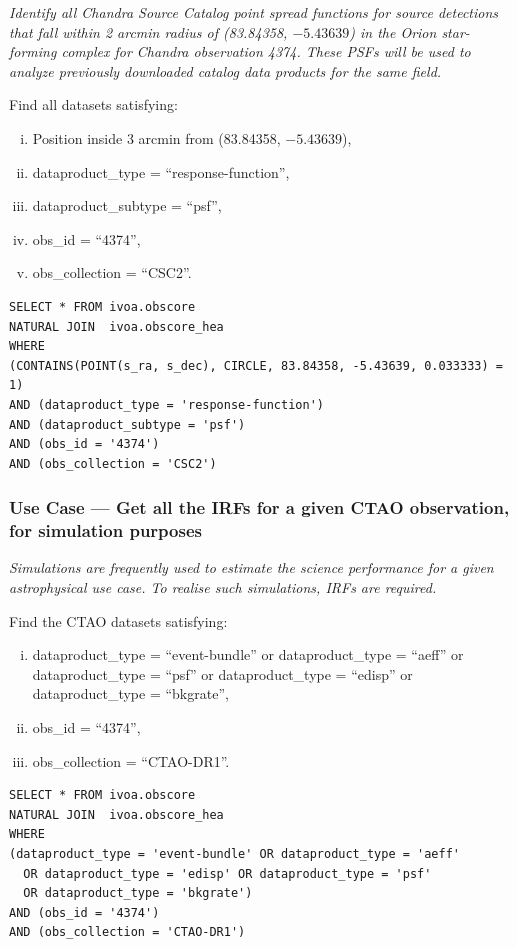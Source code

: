 {\em Identify all Chandra Source Catalog point spread functions for source detections that fall within 2 arcmin radius of  (83.84358, $-5.43639$) in the Orion star-forming complex for Chandra observation 4374.  These PSFs will be used to analyze previously downloaded catalog data products for the same field.\/ }

\medskip
\noindent Find all datasets satisfying:
\begin{enumerate}[(i)]
  \item Position inside 3 arcmin from (83.84358, $-5.43639$),
  \item dataproduct\_type = ``response-function'',
  \item dataproduct\_subtype = ``psf'',
  \item obs\_id = ``4374'',
  \item obs\_collection = ``CSC2''.
\end{enumerate}

\begin{verbatim}
SELECT * FROM ivoa.obscore
NATURAL JOIN  ivoa.obscore_hea
WHERE
(CONTAINS(POINT(s_ra, s_dec), CIRCLE, 83.84358, -5.43639, 0.033333) = 1)
AND (dataproduct_type = 'response-function')
AND (dataproduct_subtype = 'psf')
AND (obs_id = '4374')
AND (obs_collection = 'CSC2')
\end{verbatim}


\subsubsection{Use Case --- Get all the \glspl{IRF} for a given CTAO observation, for simulation purposes}

{\em Simulations are frequently used to estimate the science performance for a given astrophysical use case. To realise such simulations, \glspl{IRF} are required.\/ }

\medskip
\noindent Find the CTAO datasets satisfying:
\begin{enumerate}[(i)]
  \item dataproduct\_type = ``event-bundle'' or dataproduct\_type = ``aeff'' or dataproduct\_type = ``psf'' or dataproduct\_type = ``edisp'' or dataproduct\_type = ``bkgrate'',
  \item obs\_id = ``4374'',
  \item obs\_collection = ``CTAO-DR1''.
\end{enumerate}

\begin{verbatim}
SELECT * FROM ivoa.obscore
NATURAL JOIN  ivoa.obscore_hea
WHERE
(dataproduct_type = 'event-bundle' OR dataproduct_type = 'aeff'
  OR dataproduct_type = 'edisp' OR dataproduct_type = 'psf' 
  OR dataproduct_type = 'bkgrate')
AND (obs_id = '4374')
AND (obs_collection = 'CTAO-DR1')
\end{verbatim}


